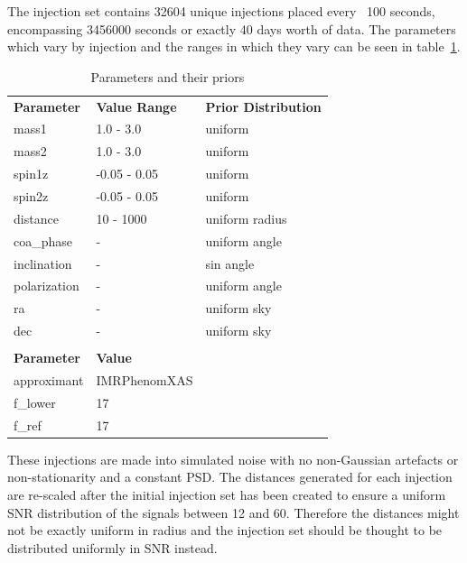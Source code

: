 The injection set contains 32604 unique injections placed every ~100 seconds, encompassing 3456000 seconds or exactly 40 days worth of data. The parameters which vary by injection and the ranges in which they vary can be seen in table~\ref{tab:ew_inj_params}.
%
\begin{table}[h]
    \centering
    \begin{tabular}{|>{\raggedright}p{3cm}|>{\raggedright}p{5cm}|>{\raggedright\arraybackslash}p{5cm}|}
        \hline
        \multicolumn{3}{|c|}{\textbf{Variable Parameters}} \\
        \hline
        \textbf{Parameter} & \textbf{Value Range} & \textbf{Prior Distribution} \\ \hline
        mass1 & 1.0 - 3.0 & uniform \\ \hline
        mass2 & 1.0 - 3.0 & uniform \\ \hline
        spin1z & -0.05 - 0.05 & uniform \\ \hline
        spin2z & -0.05 - 0.05 & uniform \\ \hline
        distance & 10 - 1000 & uniform radius \\ \hline
        coa\_phase & - & uniform angle \\ \hline
        inclination & - & sin angle \\ \hline
        polarization & - & uniform angle \\ \hline
        ra & - & uniform sky \\ \hline
        dec & - & uniform sky \\ \hline
        \hline
        \multicolumn{3}{|c|}{\textbf{Static Parameters}} \\
        \hline
        \textbf{Parameter} & \textbf{Value} & \textbf{} \\ \hline
        approximant & IMRPhenomXAS & \\ \hline
        f\_lower & 17 & \\ \hline
        f\_ref & 17 & \\ \hline
    \end{tabular}
    \caption{Parameters and their priors}
    \label{tab:ew_inj_params}
\end{table}
%
These injections are made into simulated noise with no non-Gaussian artefacts or non-stationarity and a constant PSD. The distances generated for each injection are re-scaled after the initial injection set has been created to ensure a uniform SNR distribution of the signals between 12 and 60. Therefore the distances might not be exactly uniform in radius and the injection set should be thought to be distributed uniformly in SNR instead.

